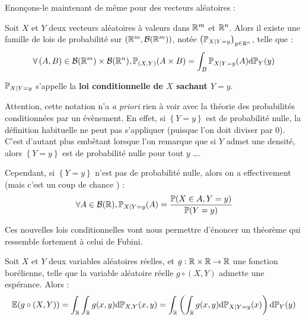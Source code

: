 \documentclass[../integ-proba.tex]{subfiles}
\begin{document}
    Enonçons-le maintenant de même pour des vecteurs aléatoires :

    \begin{thm}
        Soit $X$ et $Y$ deux vecteurs aléatoires à valeurs dans $\mathbb{R}^m$ et $\mathbb{R}^n$.
        Alors il existe une famille de lois de probabilité sur $\left( \mathbb{R}^m, \mathcal{B}(\mathbb{R}^m) \right)$, notée $\left( \mathbb{P}_{X | Y = y} \right)_{y \in \mathbb{R}^n}$, telle que :
        \begin{displaymath}
            \forall \left( A, B \right) \in \mathcal{B}(\mathbb{R}^m) \times \mathcal{B}(\mathbb{R}^n), \mathbb{P}_{\left( X,Y \right)}(A \times B) = \int_B \mathbb{P}_{X | Y = y}(A) \textnormal{d}\mathbb{P}_Y(y)
        \end{displaymath}

        $\mathbb{P}_{X | Y = y}$ s'appelle la \textbf{loi conditionnelle de $X$ sachant $Y = y$}.
    \end{thm}

    \begin{rem}
        Attention, cette notation n'a \textit{a priori} rien à voir avec la théorie des probabilités conditionnées par un évènement.
        En effet, si $\left\{ Y = y \right\}$ est de probabilité nulle, la définition habituelle ne peut pas s'appliquer (puisque l'on doit diviser par 0).
        C'est d'autant plus embêtant lorsque l'on remarque que si $Y$ admet une densité, alors $\left\{ Y = y \right\}$ est de probabilité nulle pour tout $y$ \ldots.

        Cependant, si $\left\{ Y = y \right\}$ n'est pas de probabilité nulle, alors on a effectivement (mais c'est un \og coup de chance \fg) :
        \begin{displaymath}
            \forall A \in \mathcal{B}(\mathbb{R}), \mathbb{P}_{X | Y = y}(A) = \dfrac{\mathbb{P}(X \in A, Y = y )}{\mathbb{P}(Y = y)}
        \end{displaymath}
    \end{rem}

    Ces nouvelles lois conditionnelles vont nous permettre d'énoncer un théorème qui ressemble fortement à celui de Fubini.

    \begin{thm}
        Soit $X$ et $Y$ deux variables aléatoires réelles, et $g : \mathbb{R} \times \mathbb{R} \rightarrow \mathbb{R}$ une fonction borélienne, telle que la variable aléatoire réelle $g \circ (X,Y)$ admette une espérance.
        Alors :
        \begin{displaymath}
            \mathbb{E}(g \circ (X,Y)) = \int_{\mathbb{R}} \int_{\mathbb{R}} g(x,y) \textnormal{d} \mathbb{P}_{X,Y} (x,y) = \int_{\mathbb{R}} \left( \int_{\mathbb{R}} g(x,y) \textnormal{d}\mathbb{P}_{X | Y=y} (x) \right) \textnormal{d} \mathbb{P}_Y (y)
        \end{displaymath}
    \end{thm}
\end{document}
